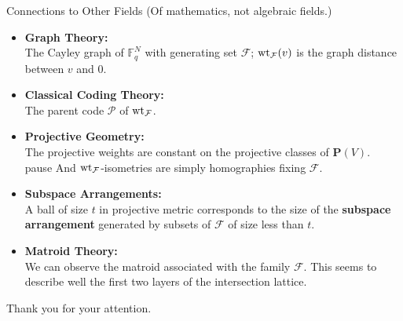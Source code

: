 \begin{frame}{Connections to Other Fields}
	{\pause (Of mathematics, not algebraic fields.)}

	\begin{itemize}
		\item \pause \textbf{Graph Theory:}\\
			The Cayley graph of \(\mathbb{F}_q^N\) with generating set \(\mathcal{F}\); \pause $\operatorname{wt}_{\mathcal{F}}(v)$ is the graph distance between \(v\) and \(0\).
		
		\item \pause \textbf{Classical Coding Theory:}\\
			The parent code \(\mathcal{P}\) of \(\operatorname{wt}_{\mathcal{F}}\).
		
		\item \pause \textbf{Projective Geometry:}\\
			The projective weights are constant on the projective classes of \(\mathbf{P}(V)\). \\ pause
			\pause And \(\operatorname{wt}_{\mathcal{F}}\)-isometries are simply homographies fixing \(\mathcal{F}\).
			
		\item \pause \textbf{Subspace Arrangements:} \\
			A ball of size \(t\) in projective metric corresponds to the size of the \textbf{subspace arrangement} generated by subsets of \(\mathcal{F}\) of size less than \(t\).     
			
		\item \pause \textbf{Matroid Theory:}\\
			We can observe the matroid associated with the family \(\mathcal{F}\). \pause This seems to describe well the first two layers of the intersection lattice.
			
	\end{itemize}
\end{frame}
	
\begin{frame}
	Thank you for your attention.	
\end{frame}